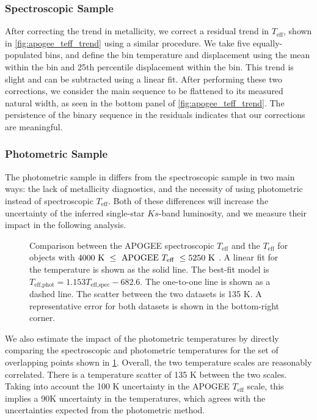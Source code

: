 \documentclass[twocolumn]{aastex6}
\newcommand{\Teff}{\ensuremath{T_{\textrm{eff}}}}
\begin{document}
\subsubsection{Spectroscopic Sample}

After correcting the trend in metallicity, we correct a residual trend in
\Teff{}, shown in \cref{fig:apogee_teff_trend} using a similar procedure. We
take five equally-populated bins, and define the bin temperature and 
displacement using the mean within the bin  and 25th percentile displacement
within the bin.  This trend is slight and can be subtracted using a linear 
fit. After performing these two corrections, we consider the main sequence to be 
flattened to its measured natural width, as seen in the bottom panel of 
\cref{fig:apogee_teff_trend}. The persistence of the binary sequence in the 
residuals indicates that our corrections are meaningful.  

\subsubsection{Photometric Sample}

The photometric sample in \citet{McQuillan14} differs from the spectroscopic
sample in two main ways: the lack of metallicity diagnostics, and the necessity
of using photometric instead of spectroscopic \Teff{}. Both of these
differences will increase the uncertainty of the inferred single-star 
\(Ks\)-band luminosity, and we measure their impact in the following analysis.


\begin{figure}[htb]
    \centering
    \caption{Comparison between the APOGEE spectroscopic \Teff{} and the
        \citet{Pinsonneault12} \Teff{} for objects with \(4000 \textrm{ K } \le
    \textrm{ APOGEE \Teff{} } \le 5250 \textrm{ K }\). A linear fit for the
    temperature is shown as the solid line. The best-fit model is
    \(T_{\textrm{eff,phot}} = 1.153 T_{\textrm{eff,spec}} - 682.6\). The 
    one-to-one line is shown as a dashed line. The scatter between the two 
    datasets is 135 K. A representative error for both datasets is shown in 
the bottom-right corner.}\label{fig:teffdiff}
\end{figure}

We also estimate the impact of the photometric temperatures by directly 
comparing the spectroscopic and photometric temperatures for the set of 
overlapping points shown in \cref{fig:teffdiff}. Overall, the two temperature scales are reasonably
correlated. There is a temperature scatter of 135 K between the two scales.
Taking into account the 100 K uncertainty in the APOGEE \Teff{} scale, this
implies a 90K uncertainty in the \citet{Pinsonneault12} temperatures, which
agrees with the uncertainties expected from the photometric method. 
\end{document}
